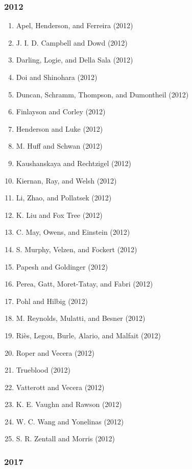 \documentclass[english,man]{apa6}
\providecommand{\tightlist}{%
  \setlength{\itemsep}{0pt}\setlength{\parskip}{0pt}}
\theoremstyle{definition}
\theoremstyle{definition}
\theoremstyle{definition}
\theoremstyle{remark}
\begin{document}
\subsubsection{2012}\label{section-44}

\begin{enumerate}
\def\labelenumi{\arabic{enumi})}
\tightlist
\item
  Apel, Henderson, and Ferreira (2012)
\item
  J. I. D. Campbell and Dowd (2012)
\item
  Darling, Logie, and Della Sala (2012)
\item
  Doi and Shinohara (2012)
\item
  Duncan, Schramm, Thompson, and Dumontheil (2012)
\item
  Finlayson and Corley (2012)
\item
  Henderson and Luke (2012)
\item
  M. Huff and Schwan (2012)
\item
  Kaushanskaya and Rechtzigel (2012)
\item
  Kiernan, Ray, and Welsh (2012)
\item
  Li, Zhao, and Pollatsek (2012)
\item
  K. Liu and Fox Tree (2012)
\item
  C. May, Owens, and Einstein (2012)
\item
  S. Murphy, Velzen, and Fockert (2012)
\item
  Papesh and Goldinger (2012)
\item
  Perea, Gatt, Moret-Tatay, and Fabri (2012)
\item
  Pohl and Hilbig (2012)
\item
  M. Reynolds, Mulatti, and Besner (2012)
\item
  Riès, Legou, Burle, Alario, and Malfait (2012)
\item
  Roper and Vecera (2012)
\item
  Trueblood (2012)
\item
  Vatterott and Vecera (2012)
\item
  K. E. Vaughn and Rawson (2012)
\item
  W. C. Wang and Yonelinas (2012)
\item
  S. R. Zentall and Morris (2012)
\end{enumerate}

\subsubsection{2017}\label{section-45}
\end{document}

